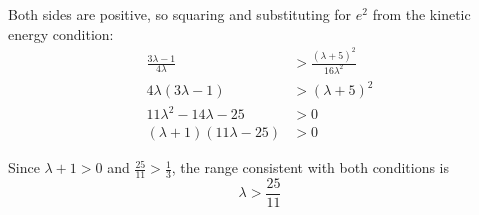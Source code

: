 \documentclass[leqno]{article}
\begin{document}
\begin{enumerate}[
  label=\textbf{\arabic*.},
  leftmargin=*,
  topsep=0pt,
  partopsep=0pt,
  parsep=0pt
]
\begin{djsSolution}
\begin{enumerate}[label=\textbf{(\alph*)}, start=1]
Both sides are positive, so squaring and substituting for \(e^2\) from the kinetic energy condition:
\begin{align*}
\frac{3\lambda-1}{4\lambda}&>\frac{(\lambda+5)^2}{16\lambda^2}\\
4\lambda(3\lambda-1)&>(\lambda+5)^2\\
11\lambda^2-14\lambda-25&>0\\
(\lambda+1)(11\lambda-25)&>0
\end{align*}

Since \(\lambda+1>0\) and \(\frac{25}{11}>\frac13\), the range consistent with both conditions is
\[
\lambda>\frac{25}{11}
\]

\end{enumerate}
\end{djsSolution}

\end{enumerate}
\end{document}
